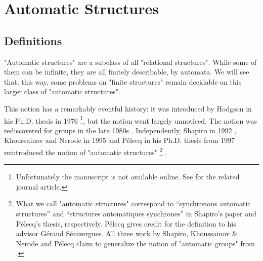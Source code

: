 \section{Automatic Structures}
\label{sec:preliminaries-automatic-structures-automatic-structures}

\subsection{Definitions}

"Automatic structures" are a subclass of all "relational structures".
While some of them can be infinite, they are all finitely describable, by
automata. We will see that, this way, some problems on "finite structures"
remain decidable on this larger class of "automatic structures".

This notion has a remarkably eventful history:
it was introduced by Hodgson in his Ph.D. thesis in 1976
\cite{Hodgson1976PhD}\footnote{Unfortunately the manuscript is not available online.
See \cite{Hodgson1983Decidabilite} for the related journal article.}, but
the notion went largely unnoticed. The notion was rediscovered for groups
in the late 1980s \cite{Epstein1992Word}. 
Independently, Shapiro in 1992 \cite{Shapiro1992AutomaticStructures},
Khoussainov and Nerode in 1995 \cite{KhoussainovNerode1995AutomaticPresentations}
and Pélecq in his Ph.D. thesis from 1997 reintroduced the notion of "automatic structures"%
\footnote{What we call "automatic structures"
correspond to ``synchronous automatic structures'' and ``structures automatiques synchrones'' in Shapiro's paper and Pélecq's thesis, respectively.
Pélecq gives credit for the definition to his advisor Géraud Sénizergues.
All three work by Shapiro, Khoussainov \& Nerode and Pélecq
claim to generalize the notion of "automatic groups" from \cite{Epstein1992Word}.}
\cite[\S~3.1.3, p.~91]{Pelecq1997Isomorphismes}.



